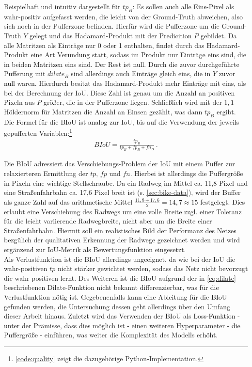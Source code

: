 Beispielhaft und intuitiv dargestellt für $tp_B$: Es sollen auch alle Eins-Pixel als wahr-positiv aufgefasst werden,
die leicht von der Ground-Truth abweichen, also sich noch in der Pufferzone befinden. 
Hierfür wird die Pufferzone um die Ground-Truth $Y$ gelegt und das Hadamard-Produkt mit der Predicition $P$ gebildet.
Da alle Matritzen als Einträge nur 0 oder 1 enthalten, findet durch das Hadamard-Produkt eine Art Verundung statt, 
sodass im Produkt nur Einträge eins sind, die in beiden Matritzen eins sind. Der Rest ist null. 
Durch die zuvor durchgeführte Pufferung mit $dilate_B$ sind allerdings auch Einträge gleich eins, die in $Y$ 
zuvor null waren. Hierdurch besitzt das Hadamard-Produkt mehr Einträge mit eins, als bei der Berechnung der \ac{IoU}.
Diese Zahl ist genau um die Anzahl an positiven Pixeln aus $P$ größer, die in der Pufferzone liegen. 
Schließlich wird mit der $1,1$-Höldernorm für Matritzen die Anzahl an Einsen gezählt, was dann $tp_B$ ergibt. \\
Die Formel für die \ac{BIoU} ist analog zur \ac{IoU}, bis auf die Verwendung der jeweils gepufferten 
Variablen:\footnote{\autoref{code:quality} zeigt die dazugehörige Python-Implementation.}
\begin{align}
	\label{eq:quality} BIoU = \frac{tp_B}{tp_B + fp_B + fn_B} ~.
\end{align}

Die \ac{BIoU} adressiert das Verschiebungs-Problem der \ac{IoU} mit einem Puffer zur relaxierteren Ermittlung der 
$tp$, $fp$ und $fn$. Hierbei ist allerdings die Puffergröße in Pixeln eine wichtige Stellschraube.  
Da ein Radweg im Mittel ca. 11,8 Pixel und eine Straßenfahrbahn ca. 17,6 Pixel breit ist (s. \autoref{sec:bike-data}), 
wird der Buffer als ganze Zahl auf das arithmetische Mittel $\frac{11,8 + 17,6}{2} = 14,7 \approx 15$ festgelegt. 
Dies erlaubt eine Verschiebung des Radwegs um eine volle Breite zzgl. einer Toleranz für die leicht variierende Radwegbreite, 
nicht aber um die Breite einer Straßenfahrbahn. Hiermit soll ein realistisches Bild der Performanz des Netzes 
bezgülich der qualitativen Erkennung der Radwege gezeichnet werden und wird ergänzend zur \ac{IoU}-Metrik 
als Bewertungsfunktion eingesetzt. \\
Als Verlustfunktion ist die \ac{BIoU} allerdings ungeeignet, da wie bei der \ac{IoU} die wahr-positiven $tp$ nicht 
stärker gewichtet werden, sodass das Netz nicht bevorzugt die wahr-positiven lernt. Des Weiteren ist die \ac{BIoU} aufgrund der 
in \autoref{eq:dilate} beschriebenen Dilate-Funktion nicht bekannt differenzierbar, was für die Verlustfunktion nötig ist. 
Gegebenenfalls kann eine Ableitung für die \ac{BIoU} gefunden werden, 
die Untersuchung dessen geht allerdings über den Umfang dieser Arbeit hinaus. 
Zuletzt wird das Verwenden der \ac{BIoU} als Loss-Funktion - unter der Prämisse, dass dies möglich ist - einen weiteren 
Hyperparameter - die Puffergröße - einführen, was weiter die Komplexität des Modells erhöht.  

